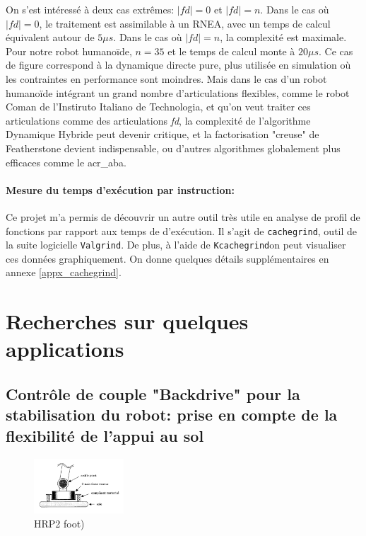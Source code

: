 \documentclass{report}
\begin{document}
On s'est intéressé à deux cas extrêmes: $|fd|=0$ et $|fd|=n$. Dans le cas où $|fd|=0$, le traitement est assimilable à un RNEA, avec un temps de calcul équivalent autour de $5\mu s$. Dans le cas où $|fd|=n$, la complexité est maximale. Pour notre robot humanoïde, $n=35$ et le temps de calcul monte à $20\mu s$. Ce cas de figure correspond à la dynamique directe pure, plus utilisée en simulation où les contraintes en performance sont moindres. Mais dans le cas d'un robot humanoïde intégrant un grand nombre d'articulations flexibles, comme le robot Coman de l'Instiruto Italiano de Technologia, et qu'on veut traiter ces articulations comme des articulations \emph{fd}, la complexité de l'algorithme Dynamique Hybride peut devenir critique, et la factorisation "creuse" de Featherstone devient indispensable, ou d'autres algorithmes globalement plus efficaces comme le \gls{acr_aba}.


\paragraph{Mesure du temps d'exécution par instruction:}
Ce projet m'a permis de découvrir un autre outil très utile en analyse de profil de fonctions par rapport aux temps de d'exécution. Il s'agit de \verb;cachegrind;, outil de la suite logicielle \verb;Valgrind;. De plus, à l'aide de \verb;Kcachegrind;on peut visualiser ces données graphiquement. On donne quelques détails supplémentaires en annexe \ref{appx_cachegrind}.


\section{Recherches sur quelques applications}

\subsection{Contrôle de couple "Backdrive" pour la stabilisation du robot: prise en compte de la flexibilité de l'appui au sol}

\begin{figure}
  \centering
  \includegraphics[width=0.3\textwidth]{figs/HRP2foot.png}
  \caption{HRP2 foot)}
  \label{fig_hrp2Foot}
\end{figure}
\end{document}
